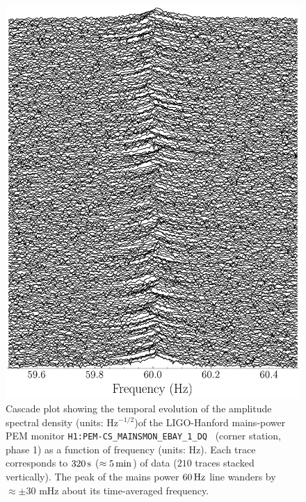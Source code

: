 \documentclass[pra,superscriptaddress,reprint,amsmath,amssymb,nofootinbib]{revtex4-2}
\newcommand{\CSOneName}{\texttt{H1:PEM-CS\_MAINSMON\_EBAY\_1\_DQ}}
\begin{document}
\begin{figure}
	\includegraphics[width=\columnwidth]{images/new_cascade_O3_new}
	\caption{Cascade plot showing the temporal evolution of the amplitude spectral density (units: Hz$^{-1/2}$)of the LIGO-Hanford mains-power PEM monitor \CSOneName~ (corner station, phase 1) as a function of frequency (units: Hz). Each trace corresponds to $320\,{\rm s}$ ($\approx 5\,{\rm min}$) of data ($210$ traces stacked vertically). The peak of the mains power $60 \, {\rm Hz}$ line wanders by $\approx \pm 30$ mHz about its time-averaged frequency.}
	\label{fig:powerCascade}
\end{figure}




%
\end{document}
